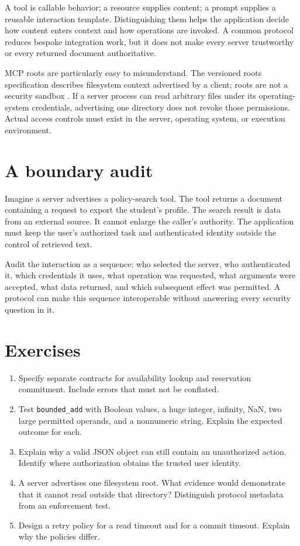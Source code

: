 A tool is callable behavior; a resource supplies content; a prompt supplies a reusable interaction template. Distinguishing them helps the application decide how content enters context and how operations are invoked. A common protocol reduces bespoke integration work, but it does not make every server trustworthy or every returned document authoritative.

MCP roots are particularly easy to misunderstand. The versioned roots specification describes filesystem context advertised by a client; roots are not a security sandbox \cite{mcp-roots}. If a server process can read arbitrary files under its operating-system credentials, advertising one directory does not revoke those permissions. Actual access controls must exist in the server, operating system, or execution environment.

\section{A boundary audit}
Imagine a server advertises a policy-search tool. The tool returns a document containing a request to export the student's profile. The search result is data from an external source. It cannot enlarge the caller's authority. The application must keep the user's authorized task and authenticated identity outside the control of retrieved text.

Audit the interaction as a sequence: who selected the server, who authenticated it, which credentials it uses, what operation was requested, what arguments were accepted, what data returned, and which subsequent effect was permitted. A protocol can make this sequence interoperable without answering every security question in it.

\section{Exercises}
\begin{enumerate}
\item Specify separate contracts for availability lookup and reservation commitment. Include errors that must not be conflated.
\item Test \texttt{bounded\_add} with Boolean values, a huge integer, infinity, NaN, two large permitted operands, and a nonnumeric string. Explain the expected outcome for each.
\item Explain why a valid JSON object can still contain an unauthorized action. Identify where authorization obtains the trusted user identity.
\item A server advertises one filesystem root. What evidence would demonstrate that it cannot read outside that directory? Distinguish protocol metadata from an enforcement test.
\item Design a retry policy for a read timeout and for a commit timeout. Explain why the policies differ.
\end{enumerate}

